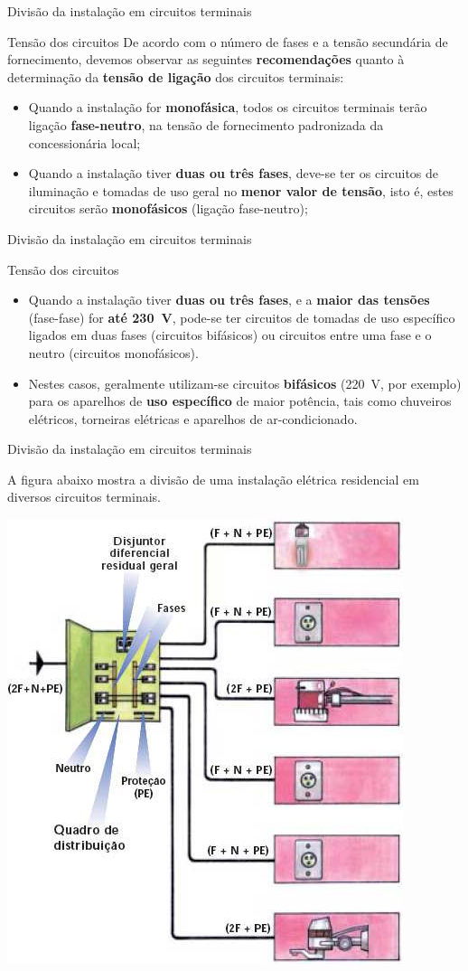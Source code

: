 \begin{frame}{Divisão da instalação em circuitos terminais}
	\begin{block}{Tensão dos circuitos}
		De acordo com o número de fases e a tensão secundária de fornecimento, devemos observar as seguintes \textbf{recomendações} quanto à determinação da \textbf{tensão de ligação} dos circuitos terminais:
		\begin{itemize}
			\item Quando a instalação for \textbf{monofásica}, todos os circuitos terminais terão ligação \textbf{fase-neutro}, na tensão de fornecimento padronizada da concessionária local;
			\item Quando a instalação tiver \textbf{duas ou três fases}, deve-se ter os circuitos de iluminação e tomadas de uso geral no \textbf{menor valor de tensão}, isto é, estes circuitos serão \textbf{monofásicos} (ligação fase-neutro);
		\end{itemize}
	\end{block}
\end{frame}


\begin{frame}{Divisão da instalação em circuitos terminais}
	\begin{block}{Tensão dos circuitos}
		\begin{itemize}
			\item Quando a instalação tiver \textbf{duas ou três fases}, e a \textbf{maior das tensões} (fase-fase) for \textbf{até \SI{230}{\volt}}, pode-se ter circuitos de tomadas de uso específico ligados em duas fases (circuitos bifásicos) ou circuitos entre uma fase e o neutro (circuitos monofásicos).
			\item Nestes casos, geralmente utilizam-se circuitos \textbf{bifásicos} (\SI{220}{\volt}, por exemplo) para os aparelhos de \textbf{uso específico} de maior potência, tais como chuveiros elétricos, torneiras elétricas e aparelhos de ar-condicionado.
		\end{itemize}
	\end{block}
\end{frame}


\begin{frame}{Divisão da instalação em circuitos terminais}
	\begin{block}{}
		A figura abaixo mostra a divisão de uma instalação elétrica residencial em diversos circuitos terminais.
	\end{block}

	\centering
	\includegraphics[width=0.45\linewidth]{Figuras/Ch05/fig17}
\end{frame}



